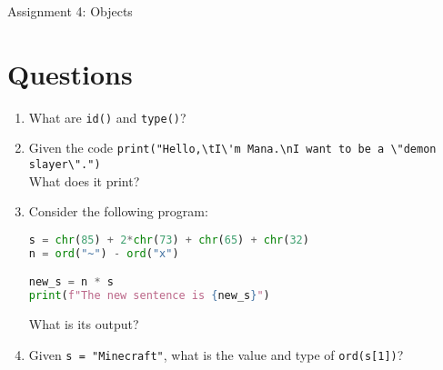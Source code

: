 \documentclass[11pt]{article}
\begin{document}
\begin{center}
    \Large{Assignment 4: Objects}
\end{center}

\section*{Questions}

\begin{enumerate}
    \item {
        What are \texttt{id()} and \texttt{type()}?
        \begin{tcolorbox}[colback=black!10!white, colframe=black!75!white, title=\textbf{Answer}]
            \vspace{2.5cm}
        \end{tcolorbox}
    }
    \item {
        Given the code \verb|print("Hello,\tI\'m Mana.\nI want to be a \"demon slayer\".")|\\
        What does it print?

        \begin{tcolorbox}[colback=black!10!white, colframe=black!75!white, title=\textbf{Answer}]
            \vspace{2.5cm}
        \end{tcolorbox}
    }
    \item {
        Consider the following program:

\begin{lstlisting}[language=Python]
s = chr(85) + 2*chr(73) + chr(65) + chr(32)
n = ord("~") - ord("x")

new_s = n * s
print(f"The new sentence is {new_s}")
\end{lstlisting}
\noindent
    What is its output?
    \begin{tcolorbox}[colback=black!10!white, colframe=black!75!white, title=\textbf{Answer}]
        \vspace{2.5cm}
    \end{tcolorbox}
    }
    \item {
        Given \verb|s = "Minecraft"|, what is the value and type of \verb|ord(s[1])|?
        \begin{tcolorbox}[colback=black!10!white, colframe=black!75!white, title=\textbf{Answer}]
            \vspace{2.5cm}
        \end{tcolorbox}    
    }
\end{enumerate}
\end{document}
